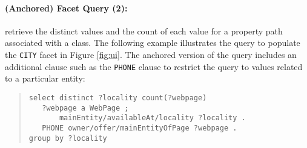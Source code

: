 \paragraph{(Anchored) Facet Query (2):} retrieve the distinct values and the count of each value for a property path associated with a class.
The following example illustrates the query to populate the \verb|CITY| facet in Figure \ref{fig:ui}.
The anchored version of the query includes an additional clause such as the \verb|PHONE| clause to restrict the query to values related to a particular entity:
\begin{quote}
{\footnotesize
\begin{verbatim}
select distinct ?locality count(?webpage)
   ?webpage a WebPage ;
       mainEntity/availableAt/locality ?locality .
   PHONE owner/offer/mainEntityOfPage ?webpage .
group by ?locality
\end{verbatim}}
\end{quote}
